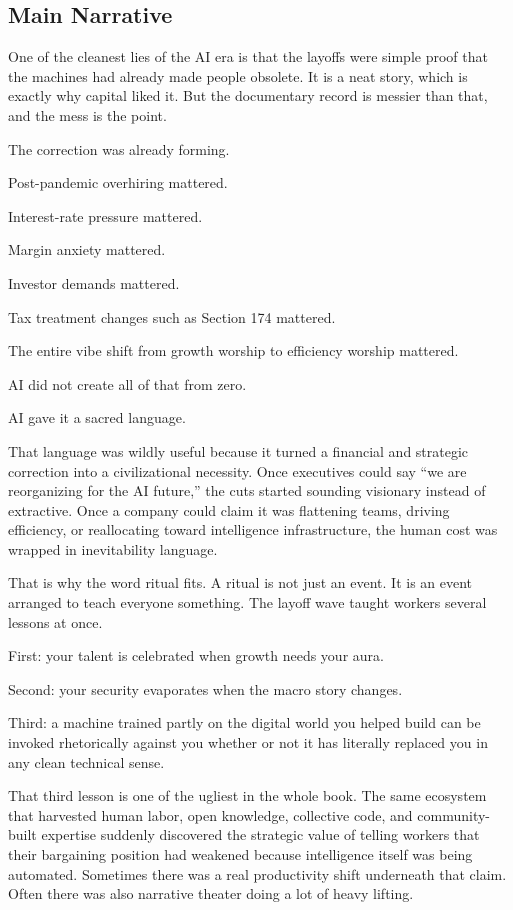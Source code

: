 \documentclass[
  american,
  12pt,
  letterpaper,
]{article}
\begin{document}
\subsection{Main Narrative}\label{main-narrative-5}

One of the cleanest lies of the AI era is that the layoffs were simple
proof that the machines had already made people obsolete. It is a neat
story, which is exactly why capital liked it. But the documentary record
is messier than that, and the mess is the point.

The correction was already forming.

Post-pandemic overhiring mattered.

Interest-rate pressure mattered.

Margin anxiety mattered.

Investor demands mattered.

Tax treatment changes such as Section 174 mattered.

The entire vibe shift from growth worship to efficiency worship
mattered.

AI did not create all of that from zero.

AI gave it a sacred language.

That language was wildly useful because it turned a financial and
strategic correction into a civilizational necessity. Once executives
could say ``we are reorganizing for the AI future,'' the cuts started
sounding visionary instead of extractive. Once a company could claim it
was flattening teams, driving efficiency, or reallocating toward
intelligence infrastructure, the human cost was wrapped in inevitability
language.

That is why the word ritual fits. A ritual is not just an event. It is
an event arranged to teach everyone something. The layoff wave taught
workers several lessons at once.

First: your talent is celebrated when growth needs your aura.

Second: your security evaporates when the macro story changes.

Third: a machine trained partly on the digital world you helped build
can be invoked rhetorically against you whether or not it has literally
replaced you in any clean technical sense.

That third lesson is one of the ugliest in the whole book. The same
ecosystem that harvested human labor, open knowledge, collective code,
and community-built expertise suddenly discovered the strategic value of
telling workers that their bargaining position had weakened because
intelligence itself was being automated. Sometimes there was a real
productivity shift underneath that claim. Often there was also narrative
theater doing a lot of heavy lifting.
\end{document}
